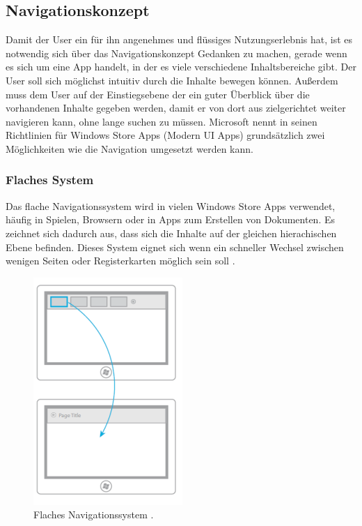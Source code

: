 \documentclass[12pt,a4paper,bibtotoc]{scrartcl}
\begin{document}
\subsection{Navigationskonzept}
\label{subsec:navikonzept}
Damit der User ein für ihn angenehmes und flüssiges Nutzungserlebnis hat, ist es notwendig sich über das Navigationskonzept Gedanken zu machen, gerade wenn es sich um eine App handelt, in der es viele verschiedene Inhaltsbereiche gibt. Der User soll sich möglichst intuitiv durch die Inhalte bewegen können. Außerdem muss dem User auf der Einstiegsebene der ein guter Überblick über die vorhandenen Inhalte gegeben werden, damit er von dort aus zielgerichtet weiter navigieren kann, ohne lange suchen zu müssen. Microsoft nennt in seinen Richtlinien für Windows Store Apps (Modern UI Apps) grundsätzlich zwei Möglichkeiten wie die Navigation umgesetzt werden kann.

\subsubsection{Flaches System}
\label{subsubsec:flachessystem}
Das flache Navigationssystem wird in vielen Windows Store Apps verwendet, häufig in Spielen, Browsern oder in Apps zum Erstellen von Dokumenten. Es zeichnet sich dadurch aus, dass sich die Inhalte auf der gleichen hierachischen Ebene befinden. Dieses System eignet sich wenn ein schneller Wechsel zwischen wenigen Seiten oder Registerkarten möglich sein soll \citep{MicrosoftNavidesign2013}.

\begin{figure}[h]	
	\centering
	\includegraphics[scale=1]{Bilder/Abbildungen/ms_navigation_flach.png} 
	\caption{Flaches Navigationssystem \protect\citep{MicrosoftNavidesign2013}.}
	\label{fig:naviflach}
\end{figure}
\end{document}
